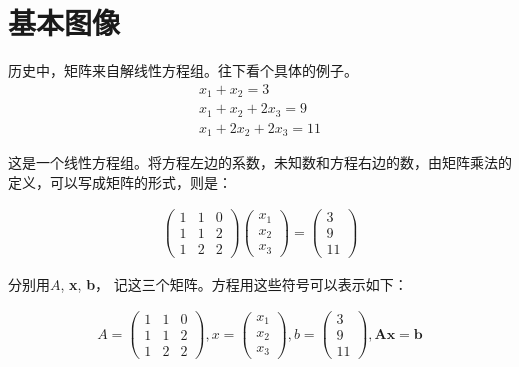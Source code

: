 \section{基本图像}
历史中，矩阵来自解线性方程组。往下看个具体的例子。
\begin{gather*}
	x_1+x_2=3\\
	x_1+x_2+2x_3=9\\
	x_1+2x_2+2x_3=11
\end{gather*}

这是一个线性方程组。将方程左边的系数，未知数和方程右边的数，由矩阵乘法的定义，可以写成矩阵的形式，则是：

\begin{gather*}
	\begin{pmatrix} 1&1&0\\1&1&2\\1&2&2 \end{pmatrix} \begin{pmatrix} x_1\\x_2\\x_3 \end{pmatrix}=
	\begin{pmatrix}	3\\9\\11 \end{pmatrix}
\end{gather*}

分别用$ A $, \textbf{x}, \textbf{b}， 记这三个矩阵。方程用这些符号可以表示如下：

\begin{gather*}
A = \begin{pmatrix} 1&1&0\\1&1&2\\1&2&2 \end{pmatrix}, x = \begin{pmatrix} x_1\\x_2\\x_3 \end{pmatrix},b = 	\begin{pmatrix}	3\\9\\11 \end{pmatrix}, \mathbf{ Ax = b }
\end{gather*}

